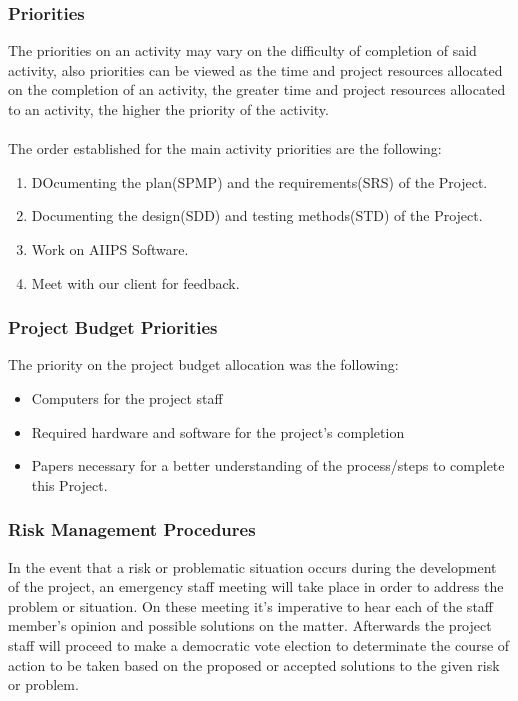 \documentclass[12pt]{article}
\begin{document}
\subsubsection{Priorities}
The priorities on an activity may vary on the difficulty of completion of said activity, also priorities can be viewed as the time and project resources allocated on the completion of an activity, the greater time and project resources allocated to an activity, the higher the priority of the activity. \\\\
	The order established for the main activity priorities are the following:

\begin{enumerate}
  \item DOcumenting the plan(SPMP) and the requirements(SRS) of the Project.
  \item Documenting the design(SDD) and testing methods(STD) of the Project.
  \item Work on AIIPS Software.
  \item Meet with our client for feedback.
\end{enumerate}

\subsubsection{Project Budget Priorities}
The priority on the project budget allocation was the following:
\begin{itemize}
  \item Computers for the project staff
  \item Required hardware and software for the project’s completion
  \item Papers necessary for a better understanding of the process/steps to complete this Project.
\end{itemize}

\subsubsection{Risk Management Procedures}
In the event that a risk or problematic situation occurs during the development of the project, an emergency staff meeting will take place in order to address the problem or situation. On these meeting it’s imperative to hear each of the staff member’s opinion and possible solutions on the matter. Afterwards the project staff will proceed to make a democratic vote election to determinate the course of action to be taken based on the proposed or accepted solutions to the given risk or problem. 
\end{document}
